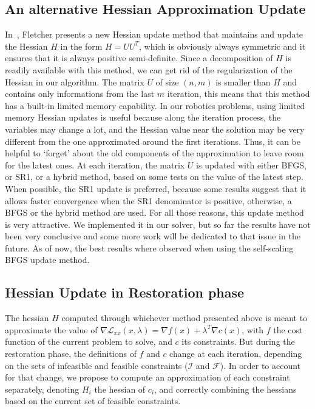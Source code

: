 \subsection{An alternative Hessian Approximation Update}
\label{sub:an_alternative_hessian_approximation_update}

In~\cite{Fletcher:ifip:2006}, Fletcher presents a new Hessian update method that maintains and update the Hessian $H$ in the form $H=U U^T$, which is obviously always symmetric and it ensures that it is always positive semi-definite.
Since a decomposition of $H$ is readily available with this method, we can get rid of the regularization of the Hessian in our algorithm.
The matrix $U$ of size $(n,m)$ is smaller than $H$ and contains only informations from the last $m$ iteration, this means that this method has a built-in limited memory capability.
In our robotics problems, using limited memory Hessian updates is useful because along the iteration process, the variables may change a lot, and the Hessian value near the solution may be very different from the one approximated around the first iterations.
Thus, it can be helpful to `forget' about the old components of the approximation to leave room for the latest ones.
At each iteration, the matrix $U$ is updated with either BFGS, or SR1, or a hybrid method, based on some tests on the value of the latest step.
When possible, the SR1 update is preferred, because some results suggest that it allows faster convergence when the SR1 denominator is positive, otherwise, a BFGS or the hybrid method are used.
For all those reasons, this update method is very attractive.
We implemented it in our solver, but so far the results have not been very conclusive and some more work will be dedicated to that issue in the future.
As of now, the best results where observed when using the self-scaling BFGS update method.

\subsection{Hessian Update in Restoration phase}
\label{sub:hessian_update_in_restoration_phase}

The hessian $H$ computed through whichever method presented above is meant to approximate the value of $\nabla \mathcal{L}_{xx}(x,\lambda) = \nabla f(x) + \lambda^T \nabla c(x)$, with $f$ the cost function of the current problem to solve, and $c$ its constraints.
But during the restoration phase, the definitions of $f$ and $c$ change at each iteration, depending on the sets of infeasible and feasible constraints ($\mathcal{I}$ and $\mathcal{F}$).
In order to account for that change, we propose to compute an approximation of each constraint separately, denoting $H_i$ the hessian of $c_i$, and correctly combining the hessians based on the current set of feasible constraints.

